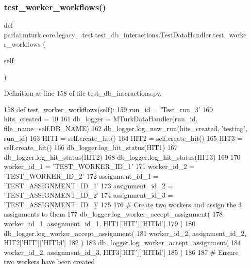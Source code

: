 \subsubsection{\texorpdfstring{test\+\_\+worker\+\_\+workflows()}{test\_worker\_workflows()}}
{\footnotesize\ttfamily def parlai.\+mturk.\+core.\+legacy\+\_.\+test.\+test\+\_\+db\+\_\+interactions.\+Test\+Data\+Handler.\+test\+\_\+worker\+\_\+workflows (\begin{DoxyParamCaption}\item[{}]{self }\end{DoxyParamCaption})}



Definition at line 158 of file test\+\_\+db\+\_\+interactions.\+py.


\begin{DoxyCode}
158     \textcolor{keyword}{def }test\_worker\_workflows(self):
159         run\_id = \textcolor{stringliteral}{'Test\_run\_3'}
160         hits\_created = 10
161         db\_logger = MTurkDataHandler(run\_id, file\_name=self.DB\_NAME)
162         db\_logger.log\_new\_run(hits\_created, \textcolor{stringliteral}{'testing'}, run\_id)
163         HIT1 = self.create\_hit()
164         HIT2 = self.create\_hit()
165         HIT3 = self.create\_hit()
166         db\_logger.log\_hit\_status(HIT1)
167         db\_logger.log\_hit\_status(HIT2)
168         db\_logger.log\_hit\_status(HIT3)
169 
170         worker\_id\_1 = \textcolor{stringliteral}{'TEST\_WORKER\_ID\_1'}
171         worker\_id\_2 = \textcolor{stringliteral}{'TEST\_WORKER\_ID\_2'}
172         assignment\_id\_1 = \textcolor{stringliteral}{'TEST\_ASSIGNMENT\_ID\_1'}
173         assignment\_id\_2 = \textcolor{stringliteral}{'TEST\_ASSIGNMENT\_ID\_2'}
174         assignment\_id\_3 = \textcolor{stringliteral}{'TEST\_ASSIGNMENT\_ID\_3'}
175 
176         \textcolor{comment}{# Create two workers and assign the 3 assignments to them}
177         db\_logger.log\_worker\_accept\_assignment(
178             worker\_id\_1, assignment\_id\_1, HIT1[\textcolor{stringliteral}{'HIT'}][\textcolor{stringliteral}{'HITId'}]
179         )
180         db\_logger.log\_worker\_accept\_assignment(
181             worker\_id\_2, assignment\_id\_2, HIT2[\textcolor{stringliteral}{'HIT'}][\textcolor{stringliteral}{'HITId'}]
182         )
183         db\_logger.log\_worker\_accept\_assignment(
184             worker\_id\_2, assignment\_id\_3, HIT3[\textcolor{stringliteral}{'HIT'}][\textcolor{stringliteral}{'HITId'}]
185         )
186 
187         \textcolor{comment}{# Ensure two workers have been created}

\end{DoxyCode}
